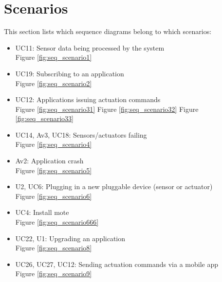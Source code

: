 

\section{Scenarios}
    This section lists which sequence diagrams belong to which scenarios:
    \begin{itemize}
        \item UC11: Sensor data being processed by the system \\
              Figure \ref{fig:seq_scenario1}

        \item UC19: Subscribing to an application \\
              Figure \ref{fig:seq_scenario2}

        \item UC12: Applications issuing actuation commands \\
              Figure \ref{fig:seq_scenario31}
              Figure \ref{fig:seq_scenario32}
              Figure \ref{fig:seq_scenario33}

        \item UC14, Av3, UC18: Sensors/actuators failing \\
              Figure \ref{fig:seq_scenario4} \\

        \item Av2: Application crash \\
              Figure \ref{fig:seq_scenario5}

        \item U2, UC6: Plugging in a new pluggable device (sensor or actuator) \\
              Figure \ref{fig:seq_scenario6}

        \item UC4: Install mote \\
              Figure \ref{fig:seq_scenario666}

        \item UC22, U1: Upgrading an application \\
              Figure \ref{fig:seq_scenario8}

        \item UC26, UC27, UC12: Sending actuation commands via a mobile app \\
              Figure \ref{fig:seq_scenario9}
    \end{itemize}

